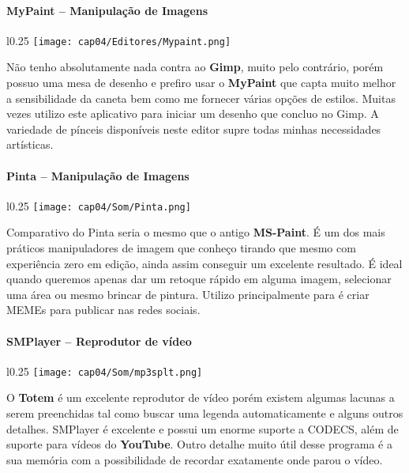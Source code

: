 \paragraph{MyPaint – Manipulação de Imagens}
\begin{minipage}{\linewidth}
 \vspace{5pt}
 \begin{wrapfigure}{l}{0.25\textwidth}
  \vspace{-\baselineskip}
  \texttt{[image: cap04/Editores/Mypaint.png]} 
 \end{wrapfigure}
 Não tenho absolutamente nada contra ao \textbf{Gimp}, muito pelo contrário, porém possuo uma mesa de desenho e prefiro usar o \textbf{MyPaint} que capta muito melhor a sensibilidade da caneta bem como me fornecer várias opções de estilos. Muitas vezes utilizo este aplicativo para iniciar um desenho que concluo no Gimp. A variedade de pínceis disponíveis neste editor supre todas minhas necessidades artísticas.
\end{minipage}

\paragraph{Pinta – Manipulação de Imagens}
\begin{minipage}{\linewidth}
 \vspace{5pt}
 \begin{wrapfigure}{l}{0.25\textwidth}
  \vspace{-\baselineskip}
  \texttt{[image: cap04/Som/Pinta.png]} 
 \end{wrapfigure}
 Comparativo do Pinta seria o mesmo que o antigo \textbf{MS-Paint}. É um dos mais práticos manipuladores de imagem que conheço tirando que mesmo com experiência zero em edição, ainda assim conseguir um excelente resultado. É ideal quando queremos apenas dar um retoque rápido em alguma imagem, selecionar uma área ou mesmo brincar de pintura. Utilizo principalmente para é criar MEMEs para publicar nas redes sociais.
\end{minipage}

\paragraph{SMPlayer – Reprodutor de vídeo}
\begin{minipage}{\linewidth}
 \vspace{5pt}
 \begin{wrapfigure}{l}{0.25\textwidth}
  \vspace{-\baselineskip}
  \texttt{[image: cap04/Som/mp3splt.png]} 
 \end{wrapfigure}
 O \textbf{Totem} é um excelente reprodutor de vídeo porém existem algumas lacunas a serem preenchidas tal como buscar uma legenda automaticamente e alguns outros detalhes. SMPlayer é excelente e possui um enorme suporte a CODECS, além de suporte para vídeos do \textbf{YouTube}. Outro detalhe muito útil desse programa é a sua memória com a possibilidade de recordar exatamente onde parou o vídeo.
\end{minipage}

